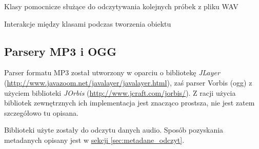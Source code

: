 {Klasy pomocnicze służące do odczytywania kolejnych próbek z pliku WAV}

{Interakcje między klasami podczas tworzenia obiektu }


\subsection{Parsery MP3 i OGG}

Parser formatu MP3 został utworzony w oparciu o bibliotekę
\emph{JLayer} (\url{http://www.javazoom.net/javalayer/javalayer.html}), zaś parser Vorbis (ogg) z
użyciem biblioteki \emph{JOrbis} (\url{http://www.jcraft.com/jorbis/}). Z racji użycia bibliotek
zewnętrznych ich implementacja jest znacząco prostsza, nie jest zatem szczegółowo tu opisana.

Biblioteki użyte zostały do odczytu danych audio. Sposób pozyskania metadanych opisany jest w
\hyperref[sec:metadane_odczyt]{sekcji \ref*{sec:metadane_odczyt}}.



